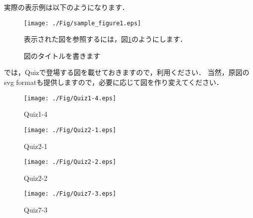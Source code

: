\documentclass[12pt,a4j,dvipdfmx]{jarticle}
\begin{document}
実際の表示例は以下のようになります．
\begin{figure}[htb]
    \begin{shadebox}
        \begin{center}
        \texttt{[image: ./Fig/sample\_figure1.eps]} 
        \caption{図のタイトルを書きます}                        
        \label{fig:例題の図}                                   
        \end{center}

        \vspace{5mm}
        \mbox{表示された図を参照するには，図\ref{fig:例題の図}のようにします．}
    \end{shadebox}
\end{figure}

\newpage
では，Quizで登場する図を載せておきますので，利用ください．
当然，原図のsvg formatも提供しますので，必要に応じて図を作り変えてください．

\begin{figure}[htb]
    \begin{center}
    \texttt{[image: ./Fig/Quiz1-4.eps]} 
    \caption{Quiz1-4}                        
    \end{center}
\end{figure}
\begin{figure}[htb]
    \begin{center}
    \texttt{[image: ./Fig/Quiz2-1.eps]} 
    \caption{Quiz2-1}                        
    \end{center}
\end{figure}
\begin{figure}[htb]
    \begin{center}
    \texttt{[image: ./Fig/Quiz2-2.eps]} 
    \caption{Quiz2-2}                        
    \end{center}
\end{figure}
\begin{figure}[htb]
    \begin{center}
    \texttt{[image: ./Fig/Quiz7-3.eps]} 
    \caption{Quiz7-3}                        
    \end{center}
\end{figure}
\end{document}
